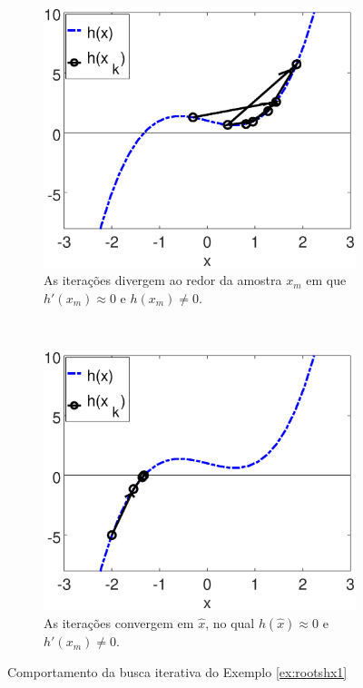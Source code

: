 \begin{figure}[!h]
    \centering
    \begin{subfigure}[b]{0.49\textwidth}
        \includegraphics[width=\textwidth]{chapters/roots/mfiles/hx/minimizando_hx_1.eps}
        \caption{As iterações divergem ao redor da amostra $x_m$ em que $h'(x_m)\approx 0$ e $h(x_m)\neq 0$.}
        \label{fig:rootsNcasesa}
    \end{subfigure}
    ~ %
    \begin{subfigure}[b]{0.49\textwidth}
        \includegraphics[width=\textwidth]{chapters/roots/mfiles/hx/minimizando_hx_2.eps}
        \caption{As iterações convergem em $\hat{x}$, no qual $h(\hat{x})\approx 0$ e $h'(x_m)\neq 0$.}
        \label{fig:rootsNcasesb}
    \end{subfigure}
    \caption{Comportamento da busca iterativa do Exemplo \ref{ex:rootshx1}}
    \label{fig:rootsNcases}
\end{figure}

